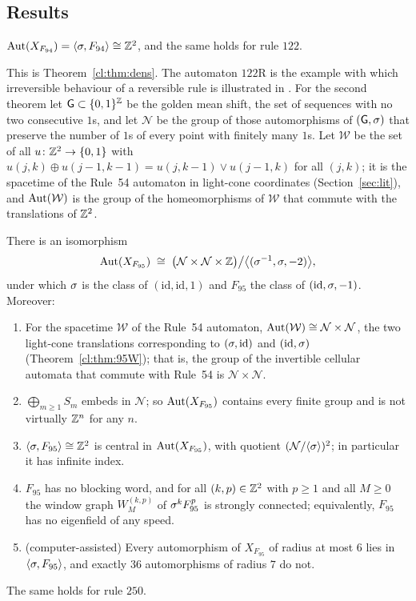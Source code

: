 \subsection{Results}

\begin{thmx}\label{thm:introA}
$\operatorname{Aut}(X_{F_{94}})=\langle\sigma,F_{94}\rangle\cong\mathbb{Z}^2$, and the same holds for rule $122$.
\end{thmx}

This is Theorem~\ref{cl:thm:dens}. The automaton $122$R is the example with which irreversible behaviour of a reversible rule is illustrated in \cite[p.~442]{Wolfram2002}. For the second theorem let $\mathsf G\subset\{0,1\}^{\mathbb{Z}}$ be the golden mean shift, the set of sequences with no two consecutive $1$s, and let $\mathcal N$ be the group of those automorphisms of $(\mathsf G,\sigma)$ that preserve the number of $1$s of every point with finitely many $1$s. Let $\mathcal W$ be the set of all $u\colon\mathbb{Z}^2\to\{0,1\}$ with $u(j,k)\oplus u(j-1,k-1)=u(j,k-1)\vee u(j-1,k)$ for all $(j,k)$; it is the spacetime of the Rule~54 automaton in light-cone coordinates (Section~\ref{sec:lit}), and $\operatorname{Aut}(\mathcal W)$ is the group of the homeomorphisms of $\mathcal W$ that commute with the translations of $\mathbb{Z}^2$.

\begin{thmx}\label{thm:introB}
There is an isomorphism
\[
\operatorname{Aut}(X_{F_{95}})\;\cong\;\bigl(\mathcal N\times\mathcal N\times\mathbb{Z}\bigr)\big/\bigl\langle(\sigma^{-1},\sigma,-2)\bigr\rangle ,
\]
under which $\sigma$ is the class of $(\mathrm{id},\mathrm{id},1)$ and $F_{95}$ the class of $(\mathrm{id},\sigma,-1)$. Moreover:
\begin{enumerate}
\item[(0)] For the spacetime $\mathcal W$ of the Rule~54 automaton, $\operatorname{Aut}(\mathcal W)\cong\mathcal N\times\mathcal N$, the two light-cone translations corresponding to $(\sigma,\mathrm{id})$ and $(\mathrm{id},\sigma)$ (Theorem~\ref{cl:thm:95W}); that is, the group of the invertible cellular automata that commute with Rule~54 is $\mathcal N\times\mathcal N$.
\item[(1)] $\bigoplus_{m\ge1}S_m$ embeds in $\mathcal N$; so $\operatorname{Aut}(X_{F_{95}})$ contains every finite group and is not virtually $\mathbb{Z}^n$ for any $n$.
\item[(2)] $\langle\sigma,F_{95}\rangle\cong\mathbb{Z}^2$ is central in $\operatorname{Aut}(X_{F_{95}})$, with quotient $(\mathcal N/\langle\sigma\rangle)^2$; in particular it has infinite index.
\item[(3)] $F_{95}$ has no blocking word, and for all $(k,p)\in\mathbb{Z}^2$ with $p\ge1$ and all $M\ge0$ the window graph $W^{(k,p)}_M$ of $\sigma^kF_{95}^p$ is strongly connected; equivalently, $F_{95}$ has no eigenfield of any speed.
\item[(4)] \textup{(computer-assisted)} Every automorphism of $X_{F_{95}}$ of radius at most $6$ lies in $\langle\sigma,F_{95}\rangle$, and exactly $36$ automorphisms of radius $7$ do not.
\end{enumerate}
The same holds for rule $250$.
\end{thmx}

